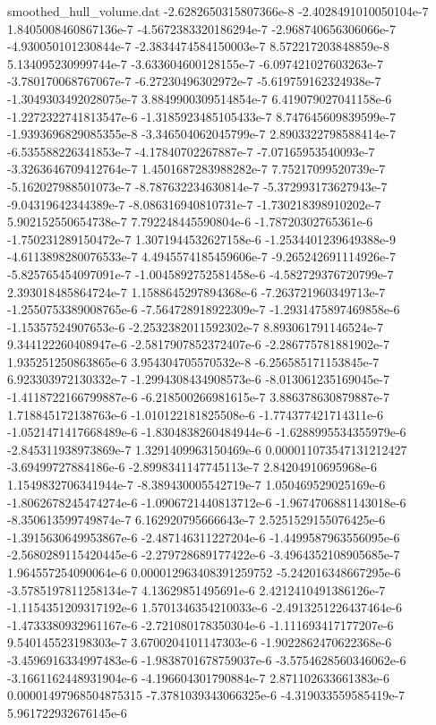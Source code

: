 \begin{filecontents}{smoothed_hull_volume.dat}
-2.6282650315807366e-8	-2.4028491010050104e-7	1.8405008460867136e-7	-4.5672383320186294e-7	-2.968740656306066e-7	-4.930050101230844e-7	-2.3834474584150003e-7	8.572217203848859e-8	5.134095230999744e-7	-3.633604600128155e-7	-6.097421027603263e-7	-3.780170068767067e-7	-6.27230496302972e-7	-5.619759162324938e-7	-1.3049303492028075e-7	3.8849900309514854e-7	6.419079027041158e-6	-1.2272322741813547e-6	-1.3185923485105433e-7	8.747645609839599e-7
-1.9393696829085355e-8	-3.346504062045799e-7	2.8903322798588414e-7	-6.535588226341853e-7	-4.17840702267887e-7	-7.07165953540093e-7	-3.3263646709412764e-7	1.4501687283988282e-7	7.75217099520739e-7	-5.162027988501073e-7	-8.787632234630814e-7	-5.372993173627943e-7	-9.04319642344389e-7	-8.086316940810731e-7	-1.730218398910202e-7	5.902152550654738e-7	7.792248445590804e-6	-1.78720302765361e-6	-1.750231289150472e-7	1.3071944532627158e-6
-1.2534401239649388e-9	-4.6113898280076533e-7	4.4945574185459606e-7	-9.265242691114926e-7	-5.825765454097091e-7	-1.0045892752581458e-6	-4.582729376720799e-7	2.393018485864724e-7	1.1588645297894368e-6	-7.263721960349713e-7	-1.2550753389008765e-6	-7.564728918922309e-7	-1.2931475897469858e-6	-1.15357524907653e-6	-2.2532382011592302e-7	8.893061791146524e-7	9.344122260408947e-6	-2.5817907852372407e-6	-2.286775781881902e-7	1.935251250863865e-6
3.954304705570532e-8	-6.256585171153845e-7	6.923303972130332e-7	-1.2994308434908573e-6	-8.013061235169045e-7	-1.4118722166799887e-6	-6.218500266981615e-7	3.886378630879887e-7	1.718845172138763e-6	-1.010122181825508e-6	-1.774377421714311e-6	-1.0521471417668489e-6	-1.8304838260484944e-6	-1.6288995534355979e-6	-2.845311938973869e-7	1.3291409963150469e-6	0.000011073547131212427	-3.69499727884186e-6	-2.8998341147745113e-7	2.84204910695968e-6
1.1549832706341944e-7	-8.389430005542719e-7	1.050469529025169e-6	-1.8062678245474274e-6	-1.0906721440813712e-6	-1.9674706881143018e-6	-8.350613599749874e-7	6.162920795666643e-7	2.5251529155076425e-6	-1.3915630649953867e-6	-2.487146311227204e-6	-1.4499587963556095e-6	-2.5680289115420445e-6	-2.279728689177422e-6	-3.4964352108905685e-7	1.964557254090064e-6	0.000012963408391259752	-5.242016348667295e-6	-3.5785197811258134e-7	4.13629851495691e-6
2.4212410491386126e-7	-1.1154351209317192e-6	1.5701346354210033e-6	-2.4913251226437464e-6	-1.4733380932961167e-6	-2.721080178350304e-6	-1.111693417177207e-6	9.540145523198303e-7	3.6700204101147303e-6	-1.9022862470622368e-6	-3.4596916334997483e-6	-1.9838701678759037e-6	-3.5754628560346062e-6	-3.1661162448931904e-6	-4.196604301790884e-7	2.871102633661383e-6	0.00001497968504875315	-7.3781039343066325e-6	-4.319033559585419e-7	5.961722932676145e-6

\end{filecontents}
